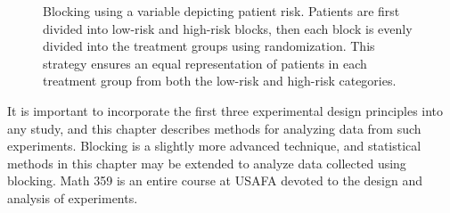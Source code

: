 \documentclass[
  letterpaper,
  DIV=11,
  numbers=noendperiod]{scrreprt}
\begin{document}
\begin{figure}


\caption{\label{fig-exp4}Blocking using a variable depicting patient
risk. Patients are first divided into low-risk and high-risk blocks,
then each block is evenly divided into the treatment groups using
randomization. This strategy ensures an equal representation of patients
in each treatment group from both the low-risk and high-risk
categories.}

\end{figure}%

It is important to incorporate the first three experimental design
principles into any study, and this chapter describes methods for
analyzing data from such experiments. Blocking is a slightly more
advanced technique, and statistical methods in this chapter may be
extended to analyze data collected using blocking. Math 359 is an entire
course at USAFA devoted to the design and analysis of experiments.
\end{document}

